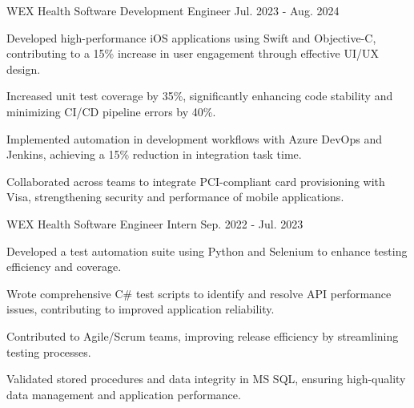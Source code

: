 


\begin{cventries}

  \cventry
    {WEX Health} %
    {Software Development Engineer} %
    {} %
    {Jul. 2023 - Aug. 2024} %
    {
      \begin{cvitems} %
      \item {Developed high-performance iOS applications using Swift and Objective-C, contributing to a 15\% increase in user engagement through effective UI/UX design.}
    \item {Increased unit test coverage by 35\%, significantly enhancing code stability and minimizing CI/CD pipeline errors by 40\%.}
    \item {Implemented automation in development workflows with Azure DevOps and Jenkins, achieving a 15\% reduction in integration task time.}
    \item {Collaborated across teams to integrate PCI-compliant card provisioning with Visa, strengthening security and performance of mobile applications.}
      \end{cvitems}
    }

  \cventry
    {WEX Health} %
    {Software Engineer Intern} %
    {} %
    {Sep. 2022 - Jul. 2023} %
    {
      \begin{cvitems} %
      \item {Developed a test automation suite using Python and Selenium to enhance testing efficiency and coverage.}
    \item {Wrote comprehensive C\# test scripts to identify and resolve API performance issues, contributing to improved application reliability.}
    \item {Contributed to Agile/Scrum teams, improving release efficiency by streamlining testing processes.}
    \item {Validated stored procedures and data integrity in MS SQL, ensuring high-quality data management and application performance.}
      \end{cvitems}
    }


\end{cventries}
